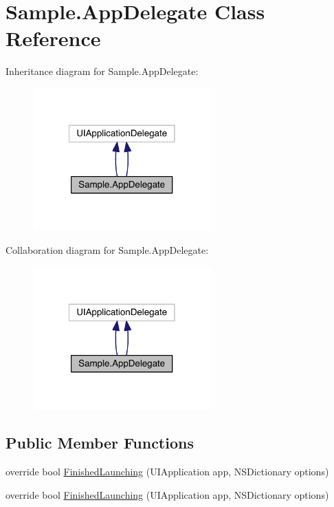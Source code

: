 \hypertarget{class_sample_1_1_app_delegate}{\section{Sample.\+App\+Delegate Class Reference}
\label{class_sample_1_1_app_delegate}
}


Inheritance diagram for Sample.\+App\+Delegate\+:
\nopagebreak
\begin{figure}[H]
\begin{center}
\leavevmode
\includegraphics[width=194pt]{class_sample_1_1_app_delegate__inherit__graph}
\end{center}
\end{figure}


Collaboration diagram for Sample.\+App\+Delegate\+:
\nopagebreak
\begin{figure}[H]
\begin{center}
\leavevmode
\includegraphics[width=194pt]{class_sample_1_1_app_delegate__coll__graph}
\end{center}
\end{figure}
\subsection*{Public Member Functions}
\begin{DoxyCompactItemize}
\item 
override bool \hyperlink{class_sample_1_1_app_delegate_a6a0a966997a434f520aff63d71fce5dd}{Finished\+Launching} (U\+I\+Application app, N\+S\+Dictionary options)
\item 
override bool \hyperlink{class_sample_1_1_app_delegate_a6a0a966997a434f520aff63d71fce5dd}{Finished\+Launching} (U\+I\+Application app, N\+S\+Dictionary options)
\end{DoxyCompactItemize}


